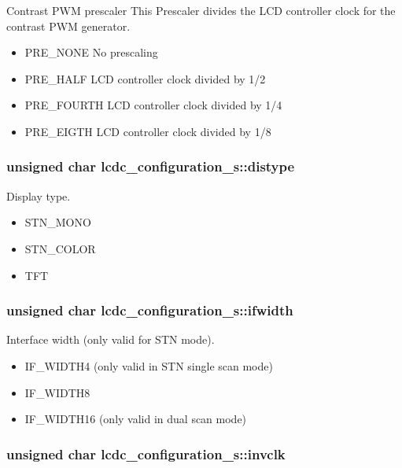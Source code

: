 Contrast PWM prescaler This Prescaler divides the LCD controller clock for the contrast PWM generator. 

\begin{itemize}
\item PRE\_\-NONE No prescaling \item PRE\_\-HALF LCD controller clock divided by 1/2 \item PRE\_\-FOURTH LCD controller clock divided by 1/4 \item PRE\_\-EIGTH LCD controller clock divided by 1/8 \end{itemize}
\hypertarget{structlcdc__configuration__s_dad6838254de608ddf7a52b687b5a89a}{
\subsubsection[{distype}]{\setlength{\rightskip}{0pt plus 5cm}unsigned char {\bf lcdc\_\-configuration\_\-s::distype}}}
\label{structlcdc__configuration__s_dad6838254de608ddf7a52b687b5a89a}


Display type. 

\begin{itemize}
\item STN\_\-MONO \item STN\_\-COLOR \item TFT \end{itemize}
\hypertarget{structlcdc__configuration__s_17aee7070ad85eab6da7f46c638de72a}{
\subsubsection[{ifwidth}]{\setlength{\rightskip}{0pt plus 5cm}unsigned char {\bf lcdc\_\-configuration\_\-s::ifwidth}}}
\label{structlcdc__configuration__s_17aee7070ad85eab6da7f46c638de72a}


Interface width (only valid for STN mode). 

\begin{itemize}
\item IF\_\-WIDTH4 (only valid in STN single scan mode) \item IF\_\-WIDTH8 \item IF\_\-WIDTH16 (only valid in dual scan mode) \end{itemize}
\hypertarget{structlcdc__configuration__s_38bd4d20773d7477fd04f68a02564963}{
\subsubsection[{invclk}]{\setlength{\rightskip}{0pt plus 5cm}unsigned char {\bf lcdc\_\-configuration\_\-s::invclk}}}
\label{structlcdc__configuration__s_38bd4d20773d7477fd04f68a02564963}


